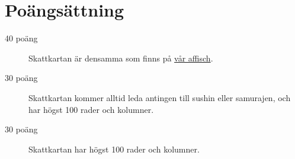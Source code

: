 \section*{Poängsättning}
\begin{description}
\item[40 poäng] Skattkartan är densamma som finns på \href{https://www.progolymp.se/2018/affisch.pdf}{vår affisch}.
\item[30 poäng] Skattkartan kommer alltid leda antingen till sushin eller samurajen, och har högst 100 rader och kolumner.
\item[30 poäng] Skattkartan har högst 100 rader och kolumner.
\end{description}
